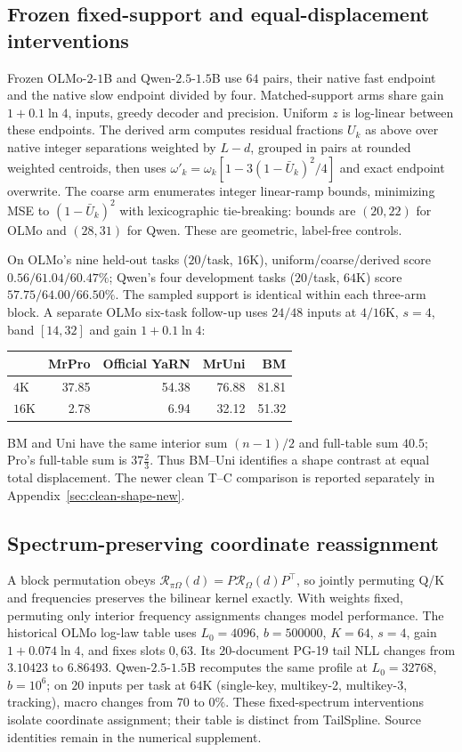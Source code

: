 \subsection{Frozen fixed-support and equal-displacement interventions}
\label{sec:frozen-fixed-support}\label{sec:four-method-control}
Frozen OLMo-$2$-$1$B and Qwen-$2.5$-$1.5$B use $64$ pairs, their native fast
endpoint and the native slow endpoint divided by four. Matched-support arms
share gain $1+0.1\ln4$, inputs, greedy decoder and precision. Uniform $z$
is log-linear between these endpoints. The derived arm computes residual
fractions $U_k$ as above over native integer separations weighted by $L-d$,
grouped in pairs at rounded weighted centroids, then uses
$\omega'_k=\omega_k[1-3(1-\bar U_k)^2/4]$ and exact endpoint overwrite.
The coarse arm enumerates integer linear-ramp bounds, minimizing MSE to
$(1-\bar U_k)^2$ with lexicographic tie-breaking: bounds are $(20,22)$ for
OLMo and $(28,31)$ for Qwen. These are geometric, label-free controls.

On OLMo's nine held-out tasks ($20$/task, $16$K), uniform/coarse/derived
score $0.56/61.04/60.47\%$; Qwen's four development tasks ($20$/task,
$64$K) score $57.75/64.00/66.50\%$. The sampled support is identical
within each three-arm block.
A separate OLMo six-task follow-up uses $24/48$ inputs at $4/16$K,
$s=4$, band $[14,32]$ and gain $1+0.1\ln4$:
\begin{center}\small
\begin{tabular}{@{}lrrrr@{}}\toprule
 & MrPro & Official YaRN & MrUni & BM\\\midrule
$4$K &37.85&54.38&76.88&81.81\\
$16$K &2.78&6.94&32.12&51.32\\\bottomrule
\end{tabular}
\end{center}
BM and Uni have the same interior sum $(n-1)/2$ and full-table sum $40.5$;
Pro's full-table sum is $37\tfrac23$. Thus BM--Uni identifies a shape
contrast at equal total displacement. The newer clean T--C comparison is
reported separately in Appendix~\ref{sec:clean-shape-new}.

\subsection{Spectrum-preserving coordinate reassignment}
\label{sec:slot-protocol}
A block permutation obeys
$\mathcal R_{\pi\Omega}(d)=P\mathcal R_\Omega(d)P^\top$, so jointly
permuting Q/K and frequencies preserves the bilinear kernel exactly.
With weights fixed, permuting only interior frequency assignments changes
model performance. The historical OLMo log-law table uses $L_0=4096$,
$b=500000$, $K=64$, $s=4$, gain $1+0.074\ln4$, and fixes slots $0,63$.
Its $20$-document PG-19 tail NLL changes from $3.10423$ to $6.86493$.
Qwen-$2.5$-$1.5$B recomputes the same profile at $L_0=32768$, $b=10^6$;
on $20$ inputs per task at $64$K (single-key, multikey-2, multikey-3,
tracking), macro changes from $70$ to $0\%$. These fixed-spectrum
interventions isolate coordinate assignment; their table is distinct from
TailSpline. Source identities remain in the numerical supplement.
